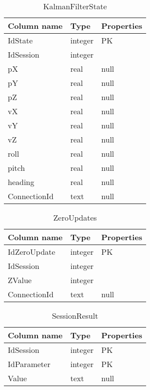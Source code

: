 \begin{table}[H] 
\caption{KalmanFilterState}
\centering
\begin{tabular}{| p{4cm} | p{3cm} | p{3cm}|}
\hline
\textbf{Column name} & \textbf{Type} & \textbf{Properties}  \\ \hline
IdState & integer & PK  \\ \hline
IdSession & integer &   \\ \hline
pX & real & null  \\ \hline
pY & real & null  \\ \hline
pZ & real & null  \\ \hline
vX & real & null  \\ \hline
vY & real & null  \\ \hline
vZ & real & null  \\ \hline
roll & real & null  \\ \hline
pitch & real & null  \\ \hline
heading & real & null  \\ \hline
ConnectionId & text & null  \\ \hline
\end{tabular}
\end{table}

\begin{table}[H] 
\caption{ZeroUpdates}
\centering
\begin{tabular}{| p{4cm} | p{3cm} | p{3cm}|}
\hline
\textbf{Column name} & \textbf{Type} & \textbf{Properties}  \\ \hline
IdZeroUpdate & integer & PK  \\ \hline
IdSession & integer &   \\ \hline
ZValue & integer &   \\ \hline
ConnectionId & text & null  \\ \hline
\end{tabular}
\end{table}

\begin{table}[H] 
\caption{SessionResult}
\centering
\begin{tabular}{| p{4cm} | p{3cm} | p{3cm}|}
\hline
\textbf{Column name} & \textbf{Type} & \textbf{Properties}  \\ \hline
IdSession & integer & PK  \\ \hline
IdParameter & integer & PK  \\ \hline
Value & text & null  \\ \hline
\end{tabular}
\end{table}

